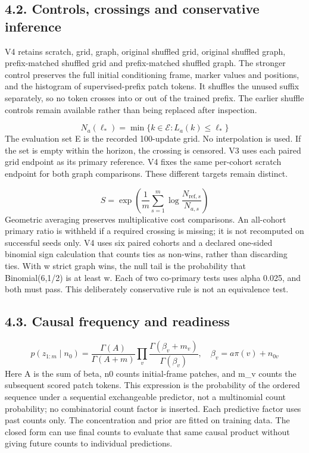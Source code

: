 \documentclass[11pt,a4paper]{article}
\begin{document}
\subsection*{4.2. Controls, crossings and conservative inference}
V4 retains scratch, grid, graph, original shuffled grid, original shuffled graph, prefix-matched shuffled grid and prefix-matched shuffled graph. The stronger control preserves the full initial conditioning frame, marker values and positions, and the histogram of supervised-prefix patch tokens. It shuffles the unused suffix separately, so no token crosses into or out of the trained prefix. The earlier shuffle controls remain available rather than being replaced after inspection.

\begin{equation}
N_a(\ell_*)=\min\{k\in\mathcal{E}:L_a(k)\leq\ell_*\}
\end{equation}
The evaluation set E is the recorded 100-update grid. No interpolation is used. If the set is empty within the horizon, the crossing is censored. V3 uses each paired grid endpoint as its primary reference. V4 fixes the same per-cohort scratch endpoint for both graph comparisons. These different targets remain distinct.

\begin{equation}
S=\exp\!\left(\frac{1}{m}\sum_{s=1}^{m}\log\frac{N_{\mathrm{ref},s}}{N_{a,s}}\right)
\end{equation}
Geometric averaging preserves multiplicative cost comparisons. An all-cohort primary ratio is withheld if a required crossing is missing; it is not recomputed on successful seeds only. V4 uses six paired cohorts and a declared one-sided binomial sign calculation that counts ties as non-wins, rather than discarding ties. With w strict graph wins, the null tail is the probability that Binomial(6,1/\allowbreak{}2) is at least w. Each of two co-primary tests uses alpha 0.025, and both must pass. This deliberately conservative rule is not an equivalence test.

\subsection*{4.3. Causal frequency and readiness}
\begin{equation}
p(z_{1:m}\mid n_0)=\frac{\Gamma(A)}{\Gamma(A+m)}\prod_v\frac{\Gamma(\beta_v+m_v)}{\Gamma(\beta_v)},\quad \beta_v=a\pi(v)+n_{0v}
\end{equation}
Here A is the sum of beta, n0 counts initial-frame patches, and m\_\allowbreak{}v counts the subsequent scored patch tokens. This expression is the probability of the ordered sequence under a sequential exchangeable predictor, not a multinomial count probability; no combinatorial count factor is inserted. Each predictive factor uses past counts only. The concentration and prior are fitted on training data. The closed form can use final counts to evaluate that same causal product without giving future counts to individual predictions.
\end{document}
